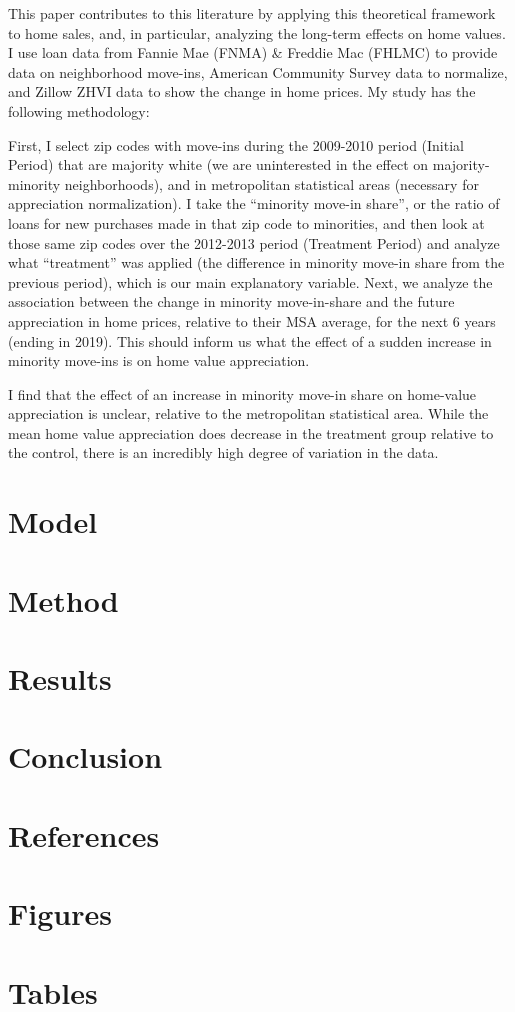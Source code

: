 \documentclass{article}
\begin{document}
This paper contributes to this literature by applying this theoretical framework to home sales, and, in particular, analyzing the long-term effects on home values. I use loan data from Fannie Mae (FNMA) \& Freddie Mac (FHLMC) to provide data on
neighborhood move-ins, American Community Survey data to normalize, and
Zillow ZHVI data to show the change in home prices. My study has the
following methodology:

First, I select zip codes with move-ins during the 2009-2010 period
(Initial Period) that are majority white (we are uninterested in the
effect on majority-minority neighborhoods), and in metropolitan
statistical areas (necessary for appreciation normalization). I take the
``minority move-in share'', or the ratio of loans for new purchases made
in that zip code to minorities, and then look at those same zip codes
over the 2012-2013 period (Treatment Period) and analyze what
``treatment'' was applied (the difference in minority move-in share from
the previous period), which is our main explanatory variable. Next, we
analyze the association between the change in minority move-in-share and
the future appreciation in home prices, relative to their MSA average,
for the next 6 years (ending in 2019). This should inform us what the
effect of a sudden increase in minority move-ins is on home value
appreciation.

I find that the effect of an increase in minority move-in share on
home-value appreciation is unclear, relative to the metropolitan
statistical area. While the mean home value appreciation does decrease
in the treatment group relative to the control, there is an incredibly
high degree of variation in the data.
\section{Model}
\section{Method}
\section{Results}
\section{Conclusion}
\section{References}
\appendix
\section{Figures}
\section{Tables}
\end{document}
